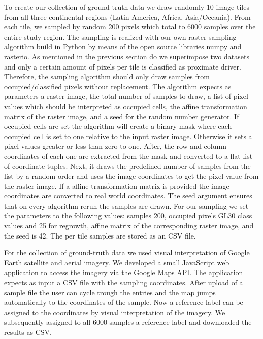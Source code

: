 			To create our collection of ground-truth data we draw randomly 10 image tiles from all three continental regions (Latin America, Africa, Asia/Oceania). From each tile, we sampled by random 200 pixels which total to 6000 samples over the entire study region. The sampling is realized with our own raster sampling algorithm build in Python by means of the open source libraries numpy and rasterio. As mentioned in the previous section do we superimpose two datasets and only a certain amount of pixels per tile is classified as proximate driver. Therefore, the sampling algorithm should only draw samples from occupied/classified pixels without replacement. The algorithm expects as parameters a raster image, the total number of samples to draw, a list of pixel values which should be interpreted as occupied cells, the affine transformation matrix of the raster image, and a seed for the random number generator. If occupied cells are set the algorithm will create a binary mask where each occupied cell is set to one relative to the input raster image. Otherwise it sets all pixel values greater or less than zero to one. After, the row and column coordinates of each one are extracted from the mask and converted to a flat list of coordinate tuples. Next, it draws the predefined number of samples from the list by a random order and uses the image coordinates to get the pixel value from the raster image. If a affine transformation matrix is provided the image coordinates are converted to real world coordinates. The seed argument ensures that on every algorithm rerun the samples are drawn. For our sampling we set the parameters to the following values: samples 200, occupied pixels \ac{GL30} class values and 25 for regrowth, affine matrix of the corresponding raster image, and the seed is 42. The per tile samples are stored as an \ac{CSV} file.

			For the collection of ground-truth data we used visual interpretation of Google Earth satellite and aerial imagery. We developed a small JavaScript web application to access the imagery via the Google Maps \ac{API}. The application expects as input a \ac{CSV} file with the sampling coordinates. After upload of a sample file the user can cycle trough the entries and the map jumps automatically to the coordinates of the sample. Now a reference label can be assigned to the coordinates by visual interpretation of the imagery. We subsequently assigned to all 6000 samples a reference label and downloaded the results as \ac{CSV}.

